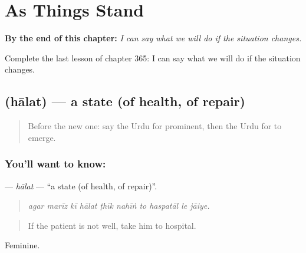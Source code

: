 
\chapter{As Things Stand}
\label{ch:ur-as-things-stand}

\begin{chapteropening}
\textbf{By the end of this chapter:} \emph{I can say what we will do if the situation changes.}

Complete the last lesson of chapter 365: I can say what we will do if the situation changes.
\end{chapteropening}

\section[\texorpdfstring{\ur{حالت} (hālat)}{حالت (hālat)}]{ (hālat) — a state (of health, of repair)}

\label{lesson:UR-C365-halat}



\begin{quote}
Before the new one: say the Urdu for prominent, then the Urdu for to emerge.
\end{quote}

\subsection*{You'll want to know: }
\textbf{} — \emph{hālat} — \textquotedblleft{}a state (of health, of repair)\textquotedblright{}.

\begin{quote}
         
\end{quote}

\begin{quote}
\emph{agar marīz kī hālat ṭhīk nahīṅ to haspatāl le jāiye.}
\end{quote}

\begin{quote}
If the patient is not well, take him to hospital.
\end{quote}

Feminine.

